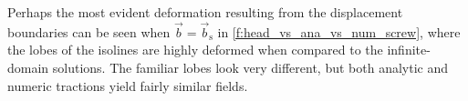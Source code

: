 \documentclass[11pt]{iopart}
\begin{document}
Perhaps the most evident deformation resulting from the displacement boundaries can be seen when $\vec{b} = \vec{b}_{\textrm{s}}$ in \cref{f:head_vs_ana_vs_num_screw}, where the lobes of the isolines are highly deformed when compared to the infinite-domain solutions. The familiar lobes look very different, but both analytic and numeric tractions yield fairly similar fields.
\begin{figure}
    \centering
    ~
    ~


\end{figure}
\end{document}
